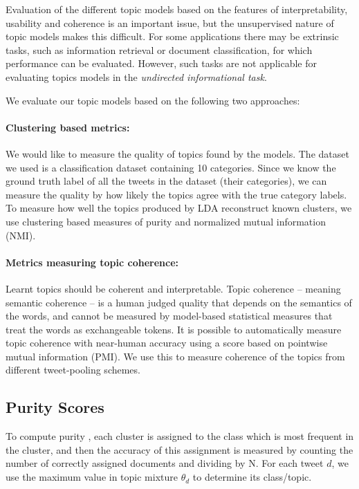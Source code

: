\documentclass[10pt,a5paper,twoside]{article}
\begin{document}

Evaluation of the different topic models based on the features of interpretability, usability and coherence is an important issue, but the unsupervised nature of topic models makes this difficult. For some applications there may be extrinsic tasks, such as information retrieval or document classification, for which performance can be evaluated. However, such tasks are not applicable for evaluating topics models in the {\it undirected informational task}. 

We evaluate our topic models based on the following two approaches:
\paragraph{Clustering based metrics:} 
We would like to measure the quality of topics found by the models. The dataset we used is a classification dataset containing 10 categories. Since we know the ground truth label of all the tweets in the dataset (their categories), we can measure the quality by how likely the topics agree with the true category labels. To measure how well the topics produced by LDA reconstruct known clusters, we use clustering based measures of purity and normalized mutual information (NMI).

\paragraph{Metrics measuring topic coherence:}
Learnt topics should be coherent and interpretable. 
Topic coherence – meaning semantic coherence – is a human judged quality that depends on the semantics of the words, and cannot be measured by model-based statistical measures that treat the words as exchangeable tokens. 
It is possible to automatically measure topic coherence with near-human accuracy
\cite{baldwin10}
using a score based on pointwise mutual information (PMI). 
We use this to measure coherence of the topics 
from different tweet-pooling schemes.

\subsection{Purity Scores}
To compute purity \cite{MRS08},
 each cluster is assigned to the class which is most frequent in the cluster, and then the accuracy of this assignment is measured by counting the number of correctly assigned documents and dividing by N. For each tweet $d$, we use the maximum value in topic mixture $\theta_{d} $ to determine its class/topic.
\end{document}
